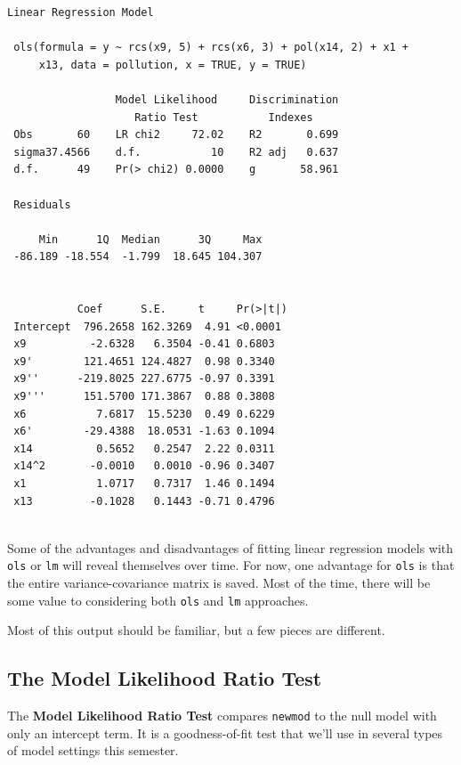 \documentclass[]{book}
\theoremstyle{definition}
\theoremstyle{definition}
\theoremstyle{definition}
\theoremstyle{remark}
\begin{document}
\begin{verbatim}
Linear Regression Model
 
 ols(formula = y ~ rcs(x9, 5) + rcs(x6, 3) + pol(x14, 2) + x1 + 
     x13, data = pollution, x = TRUE, y = TRUE)
 
                 Model Likelihood     Discrimination    
                    Ratio Test           Indexes        
 Obs       60    LR chi2     72.02    R2       0.699    
 sigma37.4566    d.f.           10    R2 adj   0.637    
 d.f.      49    Pr(> chi2) 0.0000    g       58.961    
 
 Residuals
 
     Min      1Q  Median      3Q     Max 
 -86.189 -18.554  -1.799  18.645 104.307 
 
 
           Coef      S.E.     t     Pr(>|t|)
 Intercept  796.2658 162.3269  4.91 <0.0001 
 x9          -2.6328   6.3504 -0.41 0.6803  
 x9'        121.4651 124.4827  0.98 0.3340  
 x9''      -219.8025 227.6775 -0.97 0.3391  
 x9'''      151.5700 171.3867  0.88 0.3808  
 x6           7.6817  15.5230  0.49 0.6229  
 x6'        -29.4388  18.0531 -1.63 0.1094  
 x14          0.5652   0.2547  2.22 0.0311  
 x14^2       -0.0010   0.0010 -0.96 0.3407  
 x1           1.0717   0.7317  1.46 0.1494  
 x13         -0.1028   0.1443 -0.71 0.4796  
 
\end{verbatim}

Some of the advantages and disadvantages of fitting linear regression
models with \texttt{ols} or \texttt{lm} will reveal themselves over
time. For now, one advantage for \texttt{ols} is that the entire
variance-covariance matrix is saved. Most of the time, there will be
some value to considering both \texttt{ols} and \texttt{lm} approaches.

Most of this output should be familiar, but a few pieces are different.

\subsection{The Model Likelihood Ratio
Test}\label{the-model-likelihood-ratio-test}

The \textbf{Model Likelihood Ratio Test} compares \texttt{newmod} to the
null model with only an intercept term. It is a goodness-of-fit test
that we'll use in several types of model settings this semester.
\end{document}
